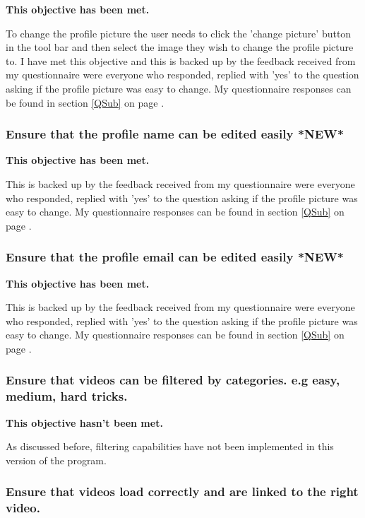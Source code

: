 \textbf{This objective has been met.}

To change the profile picture the user needs to click the 'change picture' button in the tool bar and then select the image they wish to change the profile picture to. I have met this objective and this is backed up by the feedback received from my questionnaire were everyone who responded, replied with 'yes' to the question asking if the profile picture was easy to change. My questionnaire responses can be found in section \ref{QSub} on page \pageref{QSub}.



\subsubsection {Ensure that the profile name can be edited easily *NEW*} 

\textbf{This objective has been met.}

This is backed up by the feedback received from my questionnaire were everyone who responded, replied with 'yes' to the question asking if the profile picture was easy to change. My questionnaire responses can be found in section \ref{QSub} on page \pageref{QSub}.



\subsubsection {Ensure that the profile email can be edited easily *NEW*} 

\textbf{This objective has been met.}

This is backed up by the feedback received from my questionnaire were everyone who responded, replied with 'yes' to the question asking if the profile picture was easy to change. My questionnaire responses can be found in section \ref{QSub} on page \pageref{QSub}.




\subsubsection {Ensure that videos can be filtered by categories. e.g easy, medium, hard tricks.}

\textbf{This objective hasn't been met.}

As discussed before, filtering capabilities have not been implemented in this version of the program.




\subsubsection {Ensure that videos load correctly and are linked to the right video.} 

